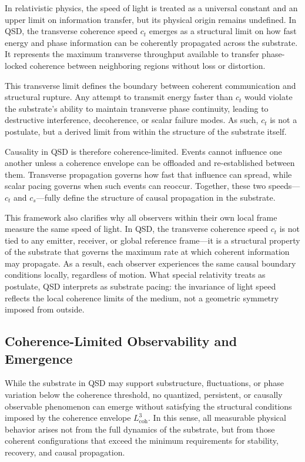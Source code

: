 \documentclass[entropy,article,submit,pdftex,moreauthors]{Definitions/mdpi}
\begin{document}
In relativistic physics, the speed of light is treated as a universal constant and an upper limit on information transfer, but its physical origin remains undefined. In QSD, the transverse coherence speed \texorpdfstring{\( c_t \)}{ct} emerges as a structural limit on how fast energy and phase information can be coherently propagated across the substrate. It represents the maximum transverse throughput available to transfer phase-locked coherence between neighboring regions without loss or distortion.

This transverse limit defines the boundary between coherent communication and structural rupture. Any attempt to transmit energy faster than \texorpdfstring{\( c_t \)}{ct} would violate the substrate's ability to maintain transverse phase continuity, leading to destructive interference, decoherence, or scalar failure modes. As such, \texorpdfstring{\( c_t \)}{ct} is not a postulate, but a derived limit from within the structure of the substrate itself.

Causality in QSD is therefore coherence-limited. Events cannot influence one another unless a coherence envelope can be offloaded and re-established between them. Transverse propagation governs how fast that influence can spread, while scalar pacing governs when such events can reoccur. Together, these two speeds—\texorpdfstring{\( c_t \)}{ct} and \texorpdfstring{\( c_s \)}{cs}—fully define the structure of causal propagation in the substrate.

This framework also clarifies why all observers within their own local frame measure the same speed of light. In QSD, the transverse coherence speed \( c_t \) is not tied to any emitter, receiver, or global reference frame—it is a structural property of the substrate that governs the maximum rate at which coherent information may propagate. As a result, each observer experiences the same causal boundary conditions locally, regardless of motion. What special relativity treats as postulate, QSD interprets as substrate pacing: the invariance of light speed reflects the local coherence limits of the medium, not a geometric symmetry imposed from outside.

\subsection{Coherence-Limited Observability and Emergence}

While the substrate in QSD may support substructure, fluctuations, or phase variation below the coherence threshold, no quantized, persistent, or causally observable phenomenon can emerge without satisfying the structural conditions imposed by the coherence envelope \texorpdfstring{\( L_{\text{coh}}^3 \)}{Lcoh\^{}3}. In this sense, all measurable physical behavior arises not from the full dynamics of the substrate, but from those coherent configurations that exceed the minimum requirements for stability, recovery, and causal propagation.
\end{document}
